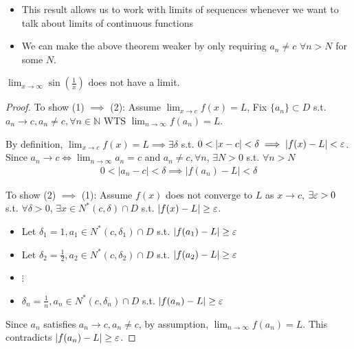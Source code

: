 \begin{remark}
    \hfill
    \begin{itemize}
        \item 
    This result allows us to work with limits of sequences whenever
    we want to talk about limits of continuous functions
        \item We can make the above theorem weaker by only requiring $a_n \neq c$
        $\forall n > N$ for some $N$.
    \end{itemize} 
\end{remark}

\begin{example}
    $\lim_{x \to \infty} \sin \left( \frac{1}{x} \right) $ does not 
    have a limit.
\end{example}

\begin{proof}
    To show (1) $\implies$ (2): 
    \medskip
    Assume $\lim_{x \to c}f(x) = L$, 
    Fix $\{ a_n \} \subset D$ s.t. $a_n \to c, a_n \neq c, \forall n \in \mathbb{N}$
    WTS $\lim_{n \to \infty}f(a_n) = L$. 
    \medskip

    By definition, $\lim_{x \to c}f(x) = L \implies \exists \delta$ s.t. 
    $0 < |x-c| < \delta \implies |f(x) - L | < \varepsilon$.
    Since $a_n \to c \iff \lim_{n \to \infty} a_n = c$ and $a_n \neq c, \forall n$,
    $\exists N > 0$ s.t. $\forall n > N$
    \begin{align*}
        0 < |a_n - c | < \delta \implies |f(a_n) - L | < \delta
    \end{align*}
    \medskip

    To show (2) $\implies$ (1): Assume $f(x)$ does not converge to $L$
    as $x \to c$, 
    $\exists \varepsilon > 0$ s.t. $\forall \delta > 0$, 
    $\exists x \in N^*(c, \delta) \cap D$ s.t. $|f(x) - L | \geq \varepsilon$.
    \begin{itemize}
        \item Let $\delta_1 = 1, a_1 \in N^*(c, \delta_1) \cap D$ s.t. $|f(a_1) - L | \geq \varepsilon$
        \item Let $\delta_2 = \frac{1}{2}, a_2 \in N^*(c, \delta_2) \cap D$ s.t. $|f(a_2) - L | \geq \varepsilon$
        \item $\vdots$
        \item $\delta_n = \frac{1}{n}, a_n \in N^*(c, \delta_n) \cap D$ s.t. $|f(a_n) - L | \geq \varepsilon$
    \end{itemize} 
    Since $a_n$ satisfies $a_n \to c, a_n \neq c$, by assumption, 
    $\lim_{n \to \infty} f(a_n) = L$. This contradicts $|f(a_n) - L | \geq \varepsilon$.
\end{proof}

